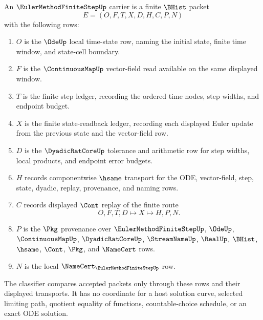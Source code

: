 \begin{definition}
\label{def:euler-method-finite-step-carrier}
An $\EulerMethodFiniteStepUp$ carrier is a finite $\BHist$ packet
$$
E=(O,F,T,X,D,H,C,P,N)
$$
with the following rows:
\begin{enumerate}
\item $O$ is the $\OdeUp$ local time-state row, naming the initial state, finite time window, and state-cell boundary.
\item $F$ is the $\ContinuousMapUp$ vector-field read available on the same displayed window.
\item $T$ is the finite step ledger, recording the ordered time nodes, step widths, and endpoint budget.
\item $X$ is the finite state-readback ledger, recording each displayed Euler update from the previous state and the vector-field row.
\item $D$ is the $\DyadicRatCoreUp$ tolerance and arithmetic row for step widths, local products, and endpoint error budgets.
\item $H$ records componentwise $\hsame$ transport for the ODE, vector-field, step, state, dyadic, replay, provenance, and naming rows.
\item $C$ records displayed $\Cont$ replay of the finite route
$$
O,F,T,D \longmapsto X \longmapsto H,P,N .
$$
\item $P$ is the $\Pkg$ provenance over $\EulerMethodFiniteStepUp$, $\OdeUp$, $\ContinuousMapUp$, $\DyadicRatCoreUp$, $\StreamNameUp$, $\RealUp$, $\BHist$, $\hsame$, $\Cont$, $\Pkg$, and $\NameCert$ rows.
\item $N$ is the local $\NameCert_{\EulerMethodFiniteStepUp}$ row.
\end{enumerate}
The classifier compares accepted packets only through these rows and their displayed transports. It has no coordinate for a host solution curve, selected limiting path, quotient equality of functions, countable-choice schedule, or an exact ODE solution.
\end{definition}

